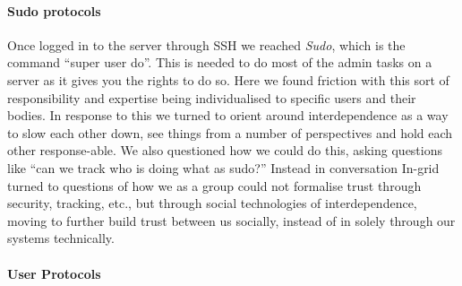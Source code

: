 \hypertarget{sudo-protocols}{%
\paragraph[Sudo
protocols]{\texorpdfstring{\protect\hypertarget{anchor}{}{}Sudo
protocols}{Sudo protocols}}\label{sudo-protocols}}

Once logged in to the server through SSH we reached \emph{Sudo}, which
is the command ``super user do''. This is needed to do most of the admin
tasks on a server as it gives you the rights to do so. Here we found
friction with this sort of responsibility and expertise being
individualised to specific users and their bodies. In response to this
we turned to orient around interdependence as a way to slow each other
down, see things from a number of perspectives and hold each other
response-able. We also questioned how we could do this, asking questions
like ``can we track who is doing what as sudo?'' Instead in conversation
In-grid turned to questions of how we as a group could not formalise
trust through security, tracking, etc., but through social technologies
of interdependence, moving to further build trust between us socially,
instead of in solely through our systems technically.

\hypertarget{user-protocols}{%
\paragraph[User
Protocols]{\texorpdfstring{\protect\hypertarget{anchor}{}{}User
Protocols}{User Protocols}}\label{user-protocols}}

